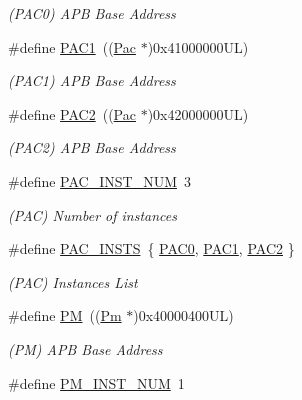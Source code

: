 \begin{DoxyCompactItemize}
\begin{DoxyCompactList}\small\item\em (P\+A\+C0) A\+PB Base Address \end{DoxyCompactList}\item 
\#define \mbox{\hyperlink{group___s_a_m_d21_e15_l__base_gabb124870d8c9b22f4aa20dde26757c1d}{P\+A\+C1}}~((\mbox{\hyperlink{struct_pac}{Pac}}      $\ast$)0x41000000\+U\+L)
\begin{DoxyCompactList}\small\item\em (P\+A\+C1) A\+PB Base Address \end{DoxyCompactList}\item 
\#define \mbox{\hyperlink{group___s_a_m_d21_e15_l__base_gae177007ea320b0310a48d5810028ecab}{P\+A\+C2}}~((\mbox{\hyperlink{struct_pac}{Pac}}      $\ast$)0x42000000\+U\+L)
\begin{DoxyCompactList}\small\item\em (P\+A\+C2) A\+PB Base Address \end{DoxyCompactList}\item 
\#define \mbox{\hyperlink{group___s_a_m_d21_e15_l__base_ga42bad78810a2b438b30d2c321bcfacd7}{P\+A\+C\+\_\+\+I\+N\+S\+T\+\_\+\+N\+UM}}~3
\begin{DoxyCompactList}\small\item\em (P\+AC) Number of instances \end{DoxyCompactList}\item 
\#define \mbox{\hyperlink{group___s_a_m_d21_e15_l__base_ga55eb07e1f77514010d2b832ebe1c99a5}{P\+A\+C\+\_\+\+I\+N\+S\+TS}}~\{ \mbox{\hyperlink{group___s_a_m_d21_j18_a__base_ga193491199100ba87dcdbb8d50837fb62}{P\+A\+C0}}, \mbox{\hyperlink{group___s_a_m_d21_j18_a__base_gabb124870d8c9b22f4aa20dde26757c1d}{P\+A\+C1}}, \mbox{\hyperlink{group___s_a_m_d21_j18_a__base_gae177007ea320b0310a48d5810028ecab}{P\+A\+C2}} \}
\begin{DoxyCompactList}\small\item\em (P\+AC) Instances List \end{DoxyCompactList}\item 
\#define \mbox{\hyperlink{group___s_a_m_d21_e15_l__base_ga23c7d58108d99a089ce0824823e6b950}{PM}}~((\mbox{\hyperlink{struct_pm}{Pm}}       $\ast$)0x40000400\+U\+L)
\begin{DoxyCompactList}\small\item\em (PM) A\+PB Base Address \end{DoxyCompactList}\item 
\#define \mbox{\hyperlink{group___s_a_m_d21_e15_l__base_gaa9ae00107674dbef876c5f1d19033054}{P\+M\+\_\+\+I\+N\+S\+T\+\_\+\+N\+UM}}~1

\end{DoxyCompactItemize}
